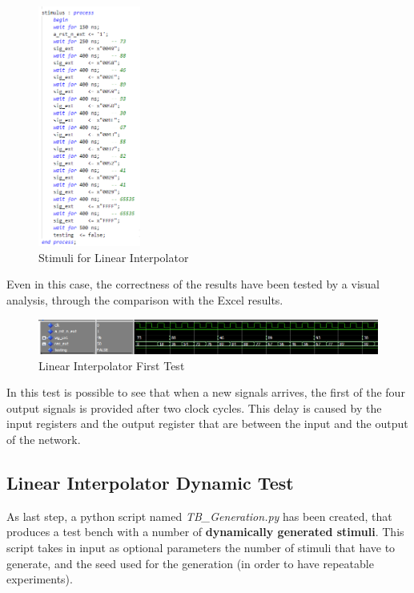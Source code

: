 \begin{figure}[H]
    \centering
    \includegraphics[width=0.3\textwidth]{img/Chapter4/Stimuli_Static.png}
    \caption{Stimuli for Linear Interpolator}
    \label{fig:LIStaticStimuli}
\end{figure}

Even in this case, the correctness of the results have been tested by a visual analysis, through the comparison with the Excel results.

\begin{figure}[H]
    \centering
    \includegraphics[width=1\textwidth]{img/Chapter4/LI_Static.png}
    \caption{Linear Interpolator First Test}
    \label{fig:LIStaticTest}
\end{figure}

In this test is possible to see that when a new signals arrives, the first of the four output signals is provided after two clock cycles. This delay is caused by the input registers and the output register that are between the input and the output of the network. 

\subsection{Linear Interpolator Dynamic Test}

As last step, a python script named \textit{TB\_Generation.py} has been created, that produces a test bench with a number of \textbf{dynamically generated stimuli}. This script takes in input as optional parameters the number of stimuli that have to generate, and the seed used for the generation (in order to have repeatable experiments).

